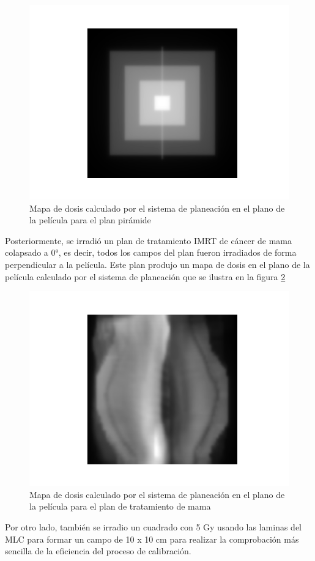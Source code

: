 \begin{figure}
	\centering
	\includegraphics[width=0.7\linewidth]{images/piramideTPS.png}
	\caption{Mapa de dosis calculado por el sistema de planeación en el plano de la película para el plan pirámide}
	\label{fig:TPSPiramide}
\end{figure}

Posteriormente, se irradió un plan de tratamiento IMRT de cáncer de mama colapsado a 0°, es decir, todos los campos del plan fueron irradiados de forma perpendicular a la película. Este plan produjo un mapa de dosis en el plano de la película calculado por el sistema de planeación que se ilustra en la figura \ref{fig:TPSMama}\\

\begin{figure}
	\centering
	\includegraphics[width=0.7\linewidth]{images/mamaTPS.png}
	\caption{Mapa de dosis calculado por el sistema de planeación en el plano de la película para el plan de tratamiento de mama}
	\label{fig:TPSMama}
\end{figure}

Por otro lado, también se irradio un cuadrado con 5 Gy usando las laminas del MLC para formar un campo de 10 x 10 cm para realizar la comprobación más sencilla de la eficiencia del proceso de calibración.\\

